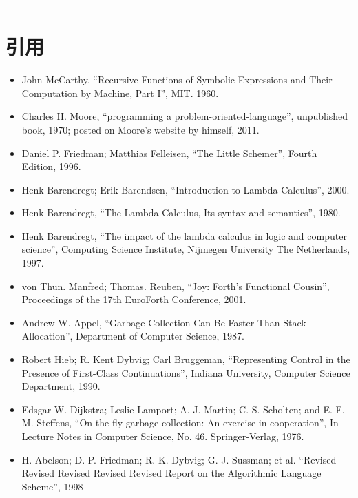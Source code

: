 \documentclass[a4paper]{article}
\begin{document}
\vspace{.5cm}\hrule\vspace{.5cm}


 \newpage




\section{引用}

\begin{itemize}
\item John McCarthy,
``Recursive Functions of Symbolic Expressions and Their Computation by Machine, Part I'',
MIT. 1960.

\item Charles H. Moore,
``programming a problem-oriented-language'',
unpublished book, 1970;
posted on Moore's website by himself, 2011.

\item Daniel P. Friedman; Matthias Felleisen,
``The Little Schemer'', Fourth Edition, 1996.

\item Henk Barendregt; Erik Barendsen,
``Introduction to Lambda Calculus'', 2000.

\item Henk Barendregt,
``The Lambda Calculus, Its syntax and semantics'', 1980.

\item Henk Barendregt,
``The impact of the lambda calculus in logic and computer science'',
Computing Science Institute, Nijmegen University The Netherlands, 1997.

\item von Thun. Manfred; Thomas. Reuben,
``Joy: Forth’s Functional Cousin'',
Proceedings of the 17th EuroForth Conference, 2001.

\item Andrew W. Appel,
``Garbage Collection Can Be Faster Than Stack Allocation'',
Department of Computer Science, 1987.

\item Robert Hieb; R. Kent Dybvig; Carl Bruggeman,
``Representing Control in the Presence of First-Class Continuations'',
Indiana University,
Computer Science Department, 1990.

\item Edsgar W. Dijkstra; Leslie Lamport;
A. J. Martin; C. S. Scholten; and E. F. M. Steffens,
``On-the-fly garbage collection: An exercise in cooperation'',
In Lecture Notes in Computer Science, No. 46. Springer-Verlag, 1976.

\item H. Abelson; D. P. Friedman; R. K. Dybvig; G. J. Sussman; et al.
``Revised Revised Revised Revised Revised Report on the Algorithmic Language Scheme'', 1998
\end{itemize}
\end{document}
